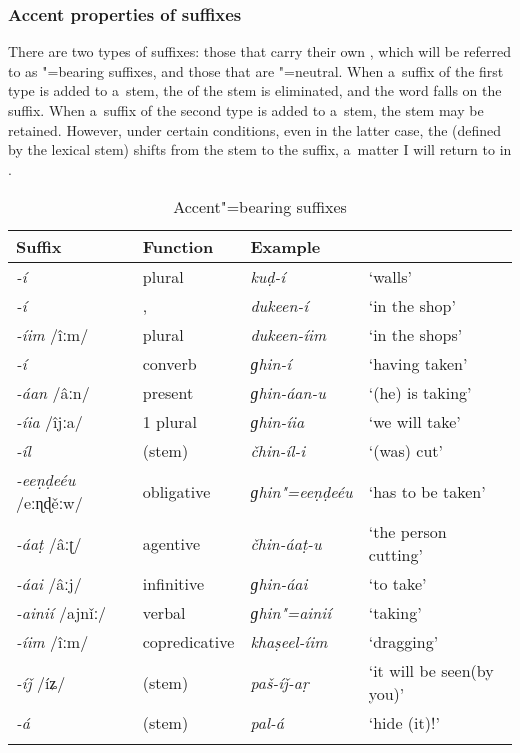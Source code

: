 \subsubsection*{Accent properties of suffixes}

There are two types of suffixes: those that carry their own , which will be referred to as
"=bearing suffixes, and those that are "=neutral. When a~suffix of the first type is added
to a~stem, the  of the stem is eliminated, and the word  falls on the suffix. When
a~suffix of the second type is added to a~stem, the stem  may be retained. However, under
certain conditions, even in the latter case, the  (defined by the lexical stem) shifts from
the stem to the suffix, a~matter I will return to in .

\begin{table} 
\caption{Accent"=bearing suffixes}
\begin{tabularx}{\textwidth}{ l l l Q }
\lsptoprule
Suffix &
Function &
Example &
\\\midrule
\textit{-í} &
plural &
\textit{kuḍ-í} &
`walls'\\
\textit{-í} &
,  &
\textit{dukeen-í} &
`in the shop'\\
\textit{-íim} /îːm/ &
plural  &
\textit{dukeen-íim} &
`in the shops'\\
\textit{-í} &
converb &
\textit{ɡhin-í} &
`having taken'\\
\textit{-áan} /âːn/ &
present &
\textit{ɡhin-áan-u} &
`(he) is taking'\\
\textit{-íia} /îjːa/ &
1 plural &
\textit{ɡhin-íia} &
`we will take'\\
\textit{-íl} &
 (stem) &
\textit{čhin-íl-i} &
`(was) cut'\\
\textit{-eeṇḍeéu} /eːɳɖěːw/ &
obligative &
\textit{ɡhin"=eeṇḍeéu} &
`has to be taken'\\
\textit{-áaṭ} /âːʈ/ &
agentive &
\textit{čhin-áaṭ-u} &
`the person cutting'\\
\textit{-áai} /âːj/ &
infinitive &
\textit{ɡhin-áai} &
`to take'\\
\textit{-ainií} /ajnǐː/ &
verbal  &
\textit{ɡhin"=ainií} &
`taking'\\
\textit{-íim} /îːm/ &
copredicative &
\textit{khaṣeel-íim} &
`dragging'\\
\textit{-íǰ} /íʑ/ &
 (stem) &
\textit{paš-íǰ-aṛ} &
`it will be seen\newline (by you)'\\
\textit{-á} &
 (stem) &
\textit{pal-á} &
`hide (it)!'\\\lspbottomrule
\end{tabularx}
\label{tab:3-5}
\end{table}


